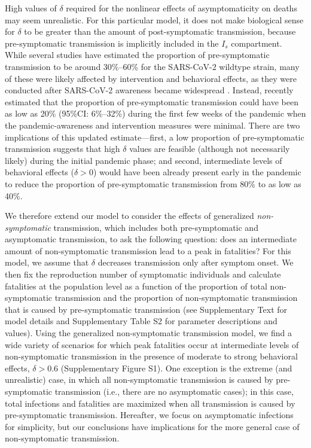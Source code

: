 \documentclass[12pt]{article}
\begin{document}
High values of $\delta$ required for the nonlinear effects of asymptomaticity on deaths may seem unrealistic.
For this particular model, it does not make biological sense for $\delta$ to be greater than the amount of post-symptomatic transmission, because pre-symptomatic transmission is implicitly included in the $I_s$ compartment.
While several studies have estimated the proportion of pre-symptomatic transmission to be around 30\%--60\% for the SARS-CoV-2 wildtype strain, many of these were likely affected by intervention and behavioral effects, as they were conducted after SARS-CoV-2 awareness became widespread \citep{he2020temporal}.
Instead, \cite{sender2021unmitigated} recently estimated that the proportion of pre-symptomatic transmission could have been as low as 20\% (95\%CI: 6\%--32\%) during the first few weeks of the pandemic when the pandemic-awareness and intervention measures were minimal.
There are two implications of this updated estimate---first, a low proportion of pre-symptomatic transmission suggests that high $\delta$ values are feasible (although not necessarily likely) during the initial pandemic phase; and second, intermediate levels of behavioral effects ($\delta > 0$) would have been already present early in the pandemic to reduce the proportion of pre-symptomatic transmission from 80\% to as low as 40\%.

We therefore extend our model to consider the effects of generalized \textit{non-symptomatic} transmission, which includes both pre-symptomatic and asymptomatic transmission, to ask the following question:
does an intermediate amount of non-symptomatic transmission lead to a peak in fatalities?
For this model, we assume that $\delta$ decreases transmission only after symptom onset.
We then fix the reproduction number of symptomatic individuals and calculate fatalities at the population level as a function of the proportion of total non-symptomatic transmission and the proportion of non-symptomatic transmission that is caused by pre-symptomatic transmission (see Supplementary Text for model details and Supplementary Table S2 for parameter descriptions and values).
Using the generalized non-symptomatic transmission model, we find a wide variety of scenarios for which peak fatalities occur at intermediate levels of non-symptomatic transmission in the presence of moderate to strong behavioral effects, $\delta > 0.6$ (Supplementary Figure S1).
One exception is the extreme (and unrealistic) case, in which all non-symptomatic transmission is caused by pre-symptomatic transmission (i.e., there are no asymptomatic cases);
in this case, total infections and fatalities are maximized when all transmission is caused by pre-symptomatic transmission. 
Hereafter, we focus on asymptomatic infections for simplicity, but our conclusions have implications for the more general case of non-symptomatic transmission.
\end{document}
